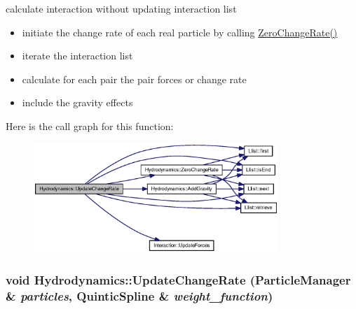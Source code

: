calculate interaction without updating interaction list 



\begin{itemize}
\item initiate the change rate of each real particle by calling \hyperlink{classHydrodynamics_67e2d72d69156a086d43168f5cd58bf7}{ZeroChangeRate()}\end{itemize}


\begin{itemize}
\item iterate the interaction list\end{itemize}


\begin{itemize}
\item calculate for each pair the pair forces or change rate\end{itemize}


\begin{itemize}
\item include the gravity effects \end{itemize}


Here is the call graph for this function:\nopagebreak
\begin{figure}[H]
\begin{center}
\leavevmode
\includegraphics[width=262pt]{classHydrodynamics_f744ee07f3f3b511d0db18949160c20a_cgraph}
\end{center}
\end{figure}
\hypertarget{classHydrodynamics_22df8569d81c4c363029efac143ddb26}{
\subsubsection[{UpdateChangeRate}]{\setlength{\rightskip}{0pt plus 5cm}void Hydrodynamics::UpdateChangeRate ({\bf ParticleManager} \& {\em particles}, \/  {\bf QuinticSpline} \& {\em weight\_\-function})}}
\label{classHydrodynamics_22df8569d81c4c363029efac143ddb26}


